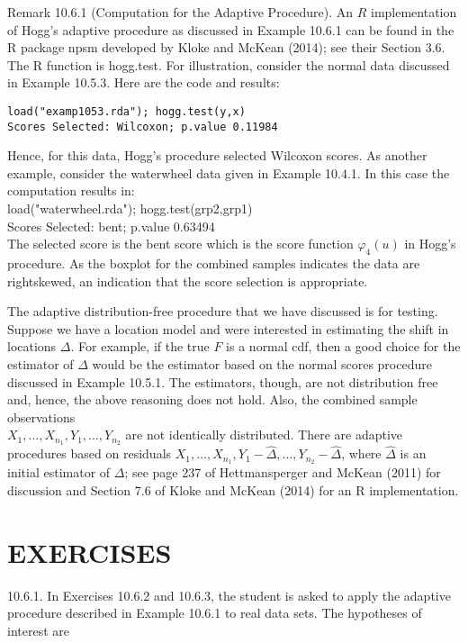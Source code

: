 Remark 10.6.1 (Computation for the Adaptive Procedure). An $R$ implementation of Hogg's adaptive procedure as discussed in Example 10.6.1 can be found in the R package npsm developed by Kloke and McKean (2014); see their Section 3.6. The R function is hogg.test. For illustration, consider the normal data discussed in Example 10.5.3. Here are the code and results:

\begin{verbatim}
load("examp1053.rda"); hogg.test(y,x)
Scores Selected: Wilcoxon; p.value 0.11984
\end{verbatim}

Hence, for this data, Hogg's procedure selected Wilcoxon scores. As another example, consider the waterwheel data given in Example 10.4.1. In this case the computation results in:\\
load("waterwheel.rda"); hogg.test(grp2,grp1)\\
Scores Selected: bent; p.value 0.63494\\
The selected score is the bent score which is the score function $\varphi_{4}(u)$ in Hogg's procedure. As the boxplot for the combined samples indicates the data are rightskewed, an indication that the score selection is appropriate.

The adaptive distribution-free procedure that we have discussed is for testing. Suppose we have a location model and were interested in estimating the shift in locations $\Delta$. For example, if the true $F$ is a normal cdf, then a good choice for the estimator of $\Delta$ would be the estimator based on the normal scores procedure discussed in Example 10.5.1. The estimators, though, are not distribution free and, hence, the above reasoning does not hold. Also, the combined sample observations\\
$X_{1}, \ldots, X_{n_{1}}, Y_{1}, \ldots, Y_{n_{2}}$ are not identically distributed. There are adaptive procedures based on residuals $X_{1}, \ldots, X_{n_{1}}, Y_{1}-\widehat{\Delta}, \ldots, Y_{n_{2}}-\widehat{\Delta}$, where $\widehat{\Delta}$ is an initial estimator of $\Delta$; see page 237 of Hettmansperger and McKean (2011) for discussion and Section 7.6 of Kloke and McKean (2014) for an R implementation.

\section*{EXERCISES}
10.6.1. In Exercises 10.6.2 and 10.6.3, the student is asked to apply the adaptive procedure described in Example 10.6.1 to real data sets. The hypotheses of interest are

